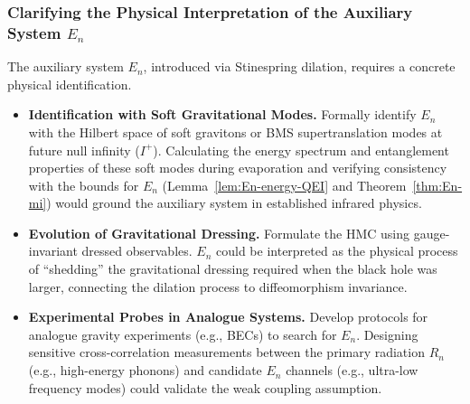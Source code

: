\documentclass[aps,prd,preprint,onecolumn,superscriptaddress,nofootinbib,longbibliography,floatfix,11pt,showpacs,showkeys]{revtex4-2}
\newcommand{\Iplus}{I^{+}}
\theoremstyle{plain}
\theoremstyle{definition}
\theoremstyle{remark}
\begin{document}
\subsubsection{Clarifying the Physical Interpretation of the Auxiliary System \texorpdfstring{$E_n$}{En}}
The auxiliary system $E_n$, introduced via Stinespring dilation, requires a concrete physical identification.
\begin{itemize}
    \item \textbf{Identification with Soft Gravitational Modes.} Formally identify $E_n$ with the Hilbert space of soft gravitons or BMS supertranslation modes at future null infinity ($\Iplus$). Calculating the energy spectrum and entanglement properties of these soft modes during evaporation and verifying consistency with the bounds for $E_n$ (Lemma~\ref{lem:En-energy-QEI} and Theorem~\ref{thm:En-mi}) would ground the auxiliary system in established infrared physics.
    \item \textbf{Evolution of Gravitational Dressing.} Formulate the HMC using gauge-invariant dressed observables. $E_n$ could be interpreted as the physical process of ``shedding'' the gravitational dressing required when the black hole was larger, connecting the dilation process to diffeomorphism invariance.
    \item \textbf{Experimental Probes in Analogue Systems.} Develop protocols for analogue gravity experiments (e.g., BECs) to search for $E_n$. Designing sensitive cross-correlation measurements between the primary radiation $R_n$ (e.g., high-energy phonons) and candidate $E_n$ channels (e.g., ultra-low frequency modes) could validate the weak coupling assumption.
\end{itemize}
\end{document}
